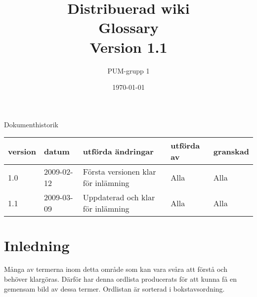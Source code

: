 

\ifpdf
\else
\fi

\title{Distribuerad wiki \\ Glossary \\ Version 1.1 }
\author{PUM-grupp 1}
\date{\today}



\maketitle\thispagestyle{empty}

\newpage

{\centering \Large{Dokumenthistorik\\}}

\vspace{10pt}
\begin{tabularx}{\textwidth}{ |l|l|X|l|l| }
  \hline
    \textbf{version} & \textbf{datum} & \textbf{utförda ändringar} & \textbf{utförda av} & \textbf{granskad} \\
	\hline 1.0 & 2009-02-12 &  Första versionen klar för inlämning  & Alla & Alla   \\
  \hline 1.1 & 2009-03-09 & Uppdaterad och klar för inlämning & Alla & Alla \\
  \hline
\end{tabularx}

\newpage

\setcounter{tocdepth}{2}
\tableofcontents
\newpage


\section{Inledning}

Många av termerna inom detta område som kan vara svåra att förstå och behöver klargöras. Därför har denna ordlista producerats för att kunna få en gemensam bild av dessa termer. Ordlistan är sorterad i bokstavsordning.

